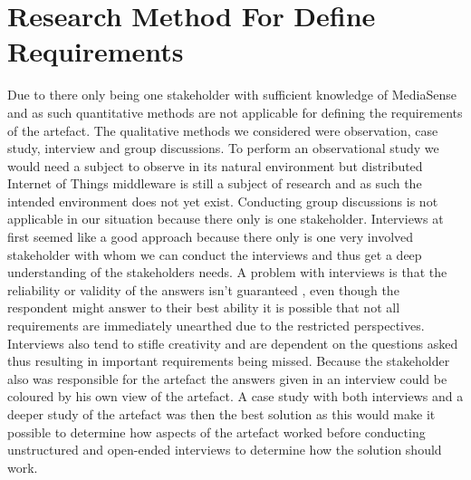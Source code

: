 \section{Research Method For Define Requirements}
Due to there only being one stakeholder with sufficient knowledge of MediaSense and as such quantitative methods are not applicable for defining the requirements of the artefact.
The qualitative methods we considered were observation, case study, interview and group discussions. To perform an observational study we would need a subject to observe in its natural environment but distributed Internet of Things middleware is still a subject of research and as such the intended environment does not yet exist. Conducting group discussions is not applicable in our situation because there only is one stakeholder.
Interviews at first seemed like a good approach because there only is one very involved stakeholder with whom we can conduct the interviews and thus get a deep understanding of the stakeholders needs. A problem with interviews is that the reliability or validity of the answers isn't guaranteed \cite{golafshani2003understanding}, even though the respondent might answer to their best ability it is possible that not all requirements are immediately unearthed due to the restricted perspectives. Interviews also tend to stifle creativity and are dependent on the questions asked \cite{johannesson2012design} thus resulting in important requirements being missed. Because the stakeholder also was responsible for the artefact the answers given in an interview could be coloured by his own view of the artefact.
A case study with both interviews and a deeper study of the artefact was then the best solution as this would make it possible to determine how aspects of the artefact worked before conducting unstructured and open-ended interviews to determine how the solution should work.

